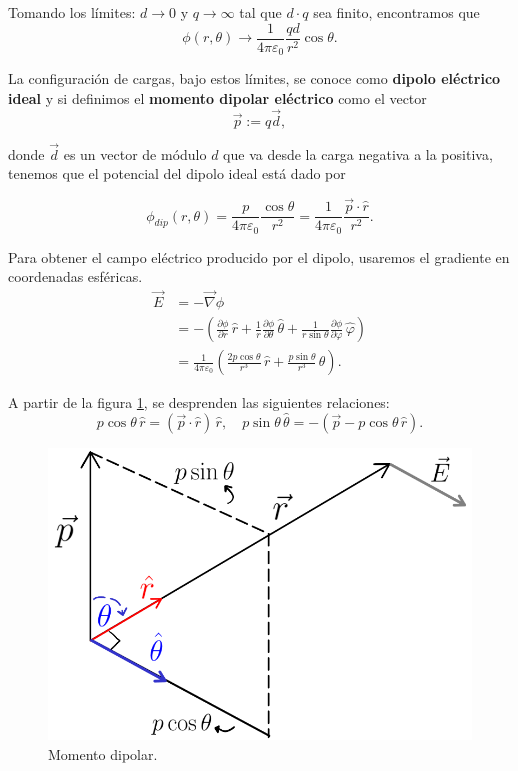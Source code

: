 Tomando los límites: $d\to 0$ y $q \to \infty$ tal que $d\cdot q$ sea finito, encontramos que 
$$\phi(r,\theta) \to  \frac{1}{4\pi \varepsilon_0} \frac{qd}{r^2} \cos \theta.$$

La configuración de cargas, bajo estos límites, se conoce como \textbf{dipolo eléctrico ideal} y si definimos el \textbf{momento dipolar eléctrico} como el vector 
$$\Vec{p} := q \Vec{d},$$

donde $\vec{d}$ es un vector de módulo $d$ que va desde la carga negativa a la positiva, tenemos que el potencial del dipolo ideal está dado por
\begin{shaded}
\begin{equation}
   \phi_{dip}(r,\theta) = \frac{p}{4\pi \varepsilon_0} \frac{\cos \theta}{r^2} = \frac{1}{4\pi \varepsilon_0} \frac{\vec{p} \cdot \hat{r}}{r^2}. \label{Potencial-Dipolo-Ideal}
\end{equation}
\end{shaded}

Para obtener el campo eléctrico producido por el dipolo, usaremos el gradiente en coordenadas esféricas.
\begin{align*}
    \Vec{E} &= - \vec{\nabla} \phi \\
    &= - \left( \frac{\partial \phi}{\partial r} \, \hat{r} +  \frac{1}{r} \frac{\partial \phi}{\partial \theta} \, \hat{\theta} + \frac{1}{r\sin\theta} \frac{\partial \phi}{\partial \varphi} \,\hat{\varphi} \right) \\
    &= \frac{1}{4\pi \varepsilon_0} \left(\frac{2p \cos\theta}{r^3} \,\hat{r} + \frac{p \sin\theta}{r^3} \,\theta \right).
\end{align*}

A partir de la figura \ref{fig:MomentoDipolar}, se desprenden las siguientes relaciones:
$$p \cos \theta\,\hat{r} = (\Vec{p} \cdot \hat{r}) \,\hat{r}, \quad p \sin \theta\,\hat{\theta} = - (\Vec{p} - p\cos\theta \,\hat{r}).$$

\begin{figure}[H]
    \centering
    \includegraphics[scale = 0.3]{Figuras/MOmentoDIpolar2.png}
    \caption{Momento dipolar.}
    \label{fig:MomentoDipolar}
\end{figure}

